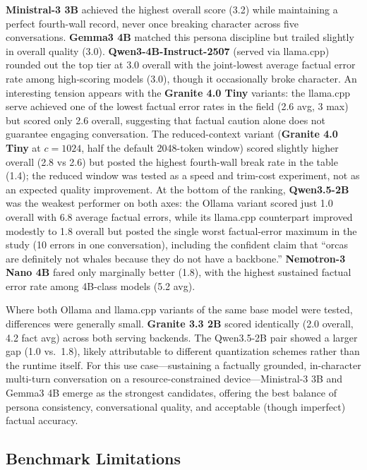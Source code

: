 \textbf{Ministral-3 3B} achieved the highest overall score (3.2) while maintaining a perfect fourth-wall record, never once breaking character across five conversations. \textbf{Gemma3 4B} matched this persona discipline but trailed slightly in overall quality (3.0). \textbf{Qwen3-4B-Instruct-2507} (served via llama.cpp) rounded out the top tier at 3.0 overall with the joint-lowest average factual error rate among high-scoring models (3.0), though it occasionally broke character. An interesting tension appears with the \textbf{Granite 4.0 Tiny} variants: the llama.cpp serve achieved one of the lowest factual error rates in the field (2.6 avg, 3 max) but scored only 2.6 overall, suggesting that factual caution alone does not guarantee engaging conversation. The reduced-context variant (\textbf{Granite 4.0 Tiny} at $c{=}1024$, half the default 2048-token window) scored slightly higher overall (2.8 vs 2.6) but posted the highest fourth-wall break rate in the table (1.4); the reduced window was tested as a speed and trim-cost experiment, not as an expected quality improvement. At the bottom of the ranking, \textbf{Qwen3.5-2B} was the weakest performer on both axes: the Ollama variant scored just 1.0 overall with 6.8 average factual errors, while its llama.cpp counterpart improved modestly to 1.8 overall but posted the single worst factual-error maximum in the study (10 errors in one conversation), including the confident claim that ``orcas are definitely not whales because they do not have a backbone.'' \textbf{Nemotron-3 Nano 4B} fared only marginally better (1.8), with the highest sustained factual error rate among 4B-class models (5.2 avg).

Where both Ollama and llama.cpp variants of the same base model were tested, differences were generally small. \textbf{Granite 3.3 2B} scored identically (2.0 overall, 4.2 fact avg) across both serving backends. The Qwen3.5-2B pair showed a larger gap (1.0 vs.\ 1.8), likely attributable to different quantization schemes rather than the runtime itself. For this use case---sustaining a factually grounded, in-character multi-turn conversation on a resource-constrained device---Ministral-3 3B and Gemma3 4B emerge as the strongest candidates, offering the best balance of persona consistency, conversational quality, and acceptable (though imperfect) factual accuracy.

\subsection{Benchmark Limitations}


